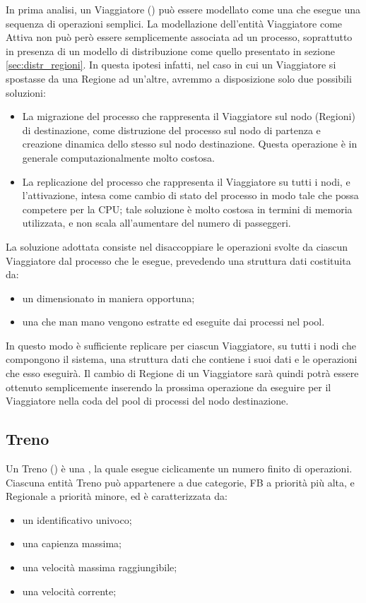 	In prima analisi, un Viaggiatore () può essere modellato come una  che esegue una sequenza di operazioni semplici.
	La modellazione dell'entità Viaggiatore come Attiva non può però essere semplicemente associata ad un processo, soprattutto in presenza di un modello di distribuzione come quello presentato in sezione \ref{sec:distr_regioni}.
	In questa ipotesi infatti, nel caso in cui un Viaggiatore si spostasse da una Regione ad un'altre, avremmo a disposizione solo due possibili soluzioni:
		\begin{itemize}
			\item La migrazione del processo che rappresenta il Viaggiatore sul nodo (Regioni) di destinazione, come distruzione del processo sul nodo di partenza e creazione dinamica dello stesso sul nodo destinazione. Questa operazione è in generale computazionalmente molto costosa. 
			\item La replicazione del processo che rappresenta il Viaggiatore su tutti i nodi, e l'attivazione, intesa come cambio di stato del processo in modo tale che possa competere per la CPU; tale soluzione è molto costosa in termini di memoria utilizzata, e non scala all'aumentare del numero di passeggeri.
		\end{itemize}
	La soluzione adottata consiste nel disaccoppiare le operazioni svolte da ciascun Viaggiatore dal processo che le esegue, prevedendo una struttura dati costituita da:
		\begin{itemize}
			\item un  dimensionato in maniera opportuna;
			\item una  che man mano vengono estratte ed eseguite dai processi nel pool.
		\end{itemize}
	In questo modo è sufficiente replicare per ciascun Viaggiatore, su tutti i nodi che compongono il sistema, una struttura dati che contiene i suoi dati e le operazioni che esso eseguirà. 
	Il cambio di Regione di un Viaggiatore sarà quindi potrà essere ottenuto semplicemente inserendo la prossima operazione da eseguire per il Viaggiatore nella coda del pool di processi del nodo destinazione.
	
	\subsection{Treno}
	Un Treno () è una , la quale esegue ciclicamente un numero finito di operazioni. Ciascuna entità Treno può appartenere a due categorie, FB a priorità più alta, e Regionale a priorità minore, ed è caratterizzata da:
		\begin{itemize}
			\item un identificativo univoco;
			\item una capienza massima;
			\item una velocità massima raggiungibile;
			\item una velocità corrente;
		\end{itemize}
	
